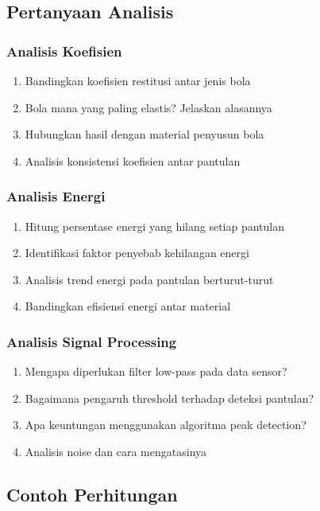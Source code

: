 \documentclass[12pt,a4paper]{article}
\begin{document}
\subsection{Pertanyaan Analisis}

\subsubsection{Analisis Koefisien}
\begin{enumerate}
    \item Bandingkan koefisien restitusi antar jenis bola
    \item Bola mana yang paling elastis? Jelaskan alasannya
    \item Hubungkan hasil dengan material penyusun bola
    \item Analisis konsistensi koefisien antar pantulan
\end{enumerate}

\subsubsection{Analisis Energi}
\begin{enumerate}
    \item Hitung persentase energi yang hilang setiap pantulan
    \item Identifikasi faktor penyebab kehilangan energi
    \item Analisis trend energi pada pantulan berturut-turut
    \item Bandingkan efisiensi energi antar material
\end{enumerate}

\subsubsection{Analisis Signal Processing}
\begin{enumerate}
    \item Mengapa diperlukan filter low-pass pada data sensor?
    \item Bagaimana pengaruh threshold terhadap deteksi pantulan?
    \item Apa keuntungan menggunakan algoritma peak detection?
    \item Analisis noise dan cara mengatasinya
\end{enumerate}

\subsection{Contoh Perhitungan}
\end{document}
